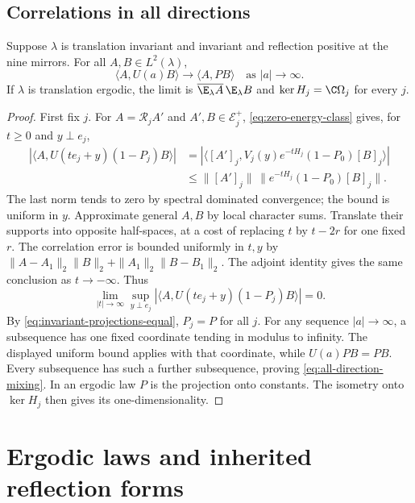 \subsection{Correlations in all directions}

\begin{proposition}\label{prop:all-direction-mixing}
Suppose $\lambda$ is translation invariant and invariant and
reflection positive at the nine mirrors. For all $A,B\in L^2(\lambda)$,
\begin{equation}\label{eq:all-direction-mixing}
 \langle A,U(a)B\rangle\longrightarrow\langle A,PB\rangle
                      \quad\text{as }|a|\longrightarrow\infty.
\end{equation}
If $\lambda$ is translation ergodic, the limit is
$\overline{\E_\lambda A}\,\E_\lambda B$ and
$\ker H_j=\C\Omega_j$ for every $j$.
\end{proposition}

\begin{proof}
First fix $j$. For $A=\mathcal R_jA'$ and $A',B\in\mathcal E_j^+$,
\eqref{eq:zero-energy-class} gives, for $t\ge0$ and $y\perp e_j$,
\begin{align*}
 |\langle A,U(te_j+y)(1-P_j)B\rangle|
 &=|\langle[A']_j,V_j(y)e^{-tH_j}(1-P_0)[B]_j\rangle|\\
 &\le\|[A']_j\|\,\|e^{-tH_j}(1-P_0)[B]_j\|.
\end{align*}
The last norm tends to zero by spectral dominated convergence;
the bound is uniform in $y$. Approximate general $A,B$ by local
character sums. Translate their supports into opposite half-spaces,
at a cost of replacing $t$ by $t-2r$ for one fixed $r$.
The correlation error is bounded uniformly in $t,y$ by
$\|A-A_1\|_2\|B\|_2+\|A_1\|_2\|B-B_1\|_2$.
The adjoint identity gives the same conclusion as $t\to-\infty$.
Thus
\[
 \lim_{|t|\to\infty}\sup_{y\perp e_j}
 |\langle A,U(te_j+y)(1-P_j)B\rangle|=0.
\]
By \eqref{eq:invariant-projections-equal}, $P_j=P$ for all $j$.
For any sequence $|a|\to\infty$, a subsequence has one fixed
coordinate tending in modulus to infinity. The displayed uniform
bound applies with that coordinate, while $U(a)PB=PB$.
Every subsequence has such a further subsequence, proving
\eqref{eq:all-direction-mixing}. In an ergodic law $P$ is the
projection onto constants. The isometry onto $\ker H_j$ then gives
its one-dimensionality.
\end{proof}

\section{Ergodic laws and inherited reflection forms}
\label{subsec:component-hypotheses}

